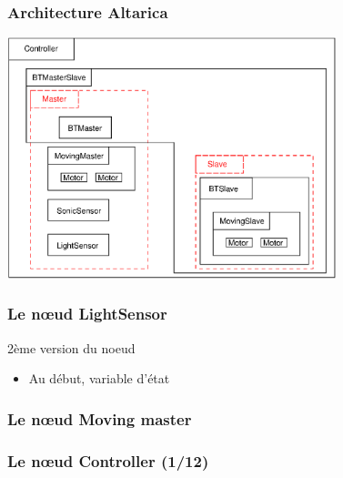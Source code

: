  \begin{frame}
  \frametitle{Architecture Altarica}
  \center
  \includegraphics[height=7cm]{ARmodel.eps}

 \end{frame}
 
 
 \begin{frame}
  \frametitle{Le n\oe{}ud LightSensor}

    \begin{block}{2ème version du noeud}
    
    \end{block}
    
    \begin{block}{}
    \begin{itemize}
      \item Au début, variable d'état
   \end{itemize}
  \end{block}

 \end{frame}
 
  \begin{frame}
  \frametitle{Le n\oe{}ud Moving master}

    \begin{block}{}
    
    \end{block}

  \end{frame}

  \begin{frame}
   \frametitle{Le n\oe{}ud Controller (1/12)}
   
       
  \end{frame}

